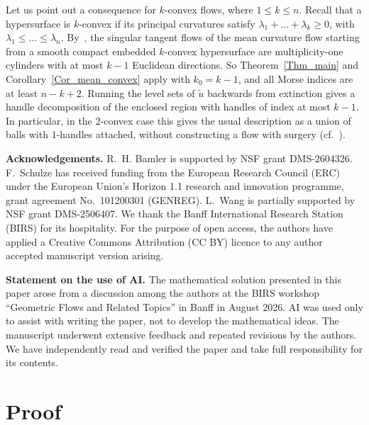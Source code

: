 \documentclass[12pt,twoside,reqno]{amsart}
\newcommand{\la}{\lambda}
\newcommand{\td}[1]{\widetilde{#1}}
\theoremstyle{definition}
\theoremstyle{remark}
\numberwithin{equation}{section}
\begin{document}
\medskip

Let us point out a consequence for $k$-convex flows, where $1\leq k\leq n$.
Recall that a hypersurface is $k$-convex if its principal curvatures satisfy $\la_1+\ldots+\la_k\geq0$, with $\la_1\leq\ldots\leq\la_n$.
By~\cite[Theorem~1.17]{CheegerHaslhoferNaber}, the singular tangent flows of the mean curvature flow starting from a smooth compact embedded $k$-convex hypersurface are multiplicity-one cylinders with at most $k-1$ Euclidean directions.
So Theorem~\ref{Thm_main} and Corollary~\ref{Cor_mean_convex} apply with $k_0=k-1$, and all Morse indices are at least $n-k+2$.
Running the level sets of $\td u$ backwards from extinction gives a handle decomposition of the enclosed region with handles of index at most $k-1$.
In particular, in the $2$-convex case this gives the usual description as a union of balls with $1$-handles attached, without constructing a flow with surgery (cf.~\cite{HuiskenSinestrari,BrendleHuisken,HaslhoferKleiner2}).

\medskip

\noindent\textbf{Acknowledgements.}
R.~H. Bamler is supported by NSF grant DMS-2604326.
F.~Schulze has received funding from the European Research Council (ERC) under the European Union's Horizon 1.1 research and innovation programme, grant agreement No.~101200301 (GENREG).
L.~Wang is partially supported by NSF grant DMS-2506407.
We thank the Banff International Research Station (BIRS) for its hospitality.
For the purpose of open access, the authors have applied a Creative Commons Attribution (CC BY) licence to any author accepted manuscript version arising.

\medskip

\noindent\textbf{Statement on the use of AI.}
The mathematical solution presented in this paper arose from a discussion among the authors at the BIRS workshop ``Geometric Flows and Related Topics'' in Banff in August 2026.
AI was used only to assist with writing the paper, not to develop the mathematical ideas.
The manuscript underwent extensive feedback and repeated revisions by the authors.
We have independently read and verified the paper and take full responsibility for its contents.

\section{Proof}
\end{document}
